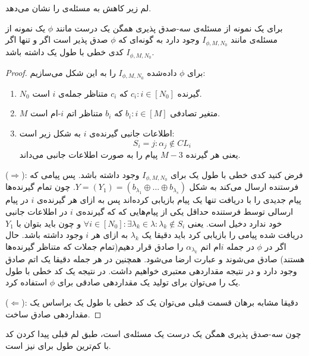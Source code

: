 لم زیر کاهش به مسئله‌ی
\picod
را نشان می‌دهد.
\begin{lemma}
    برای یک نمونه از مسئله‌ی سه-صدق پذیری همگن یک درست مانند
    $\phi$
    یک نمونه از مسئله‌ی
    \picod
    مانند
    $I_{\phi, M, N_0}$
    وجود دارد به گونه‌ای که
    $\phi$
    صدق پذیر است اگر و تنها اگر
    $I_{\phi, M, N_0}$
    کدی خطی با طول یک داشته باشد.
\end{lemma}
\begin{proof}
    برای
    $\phi$
    داده‌شده
    $I_{\phi, M, N_0}$
    را به این شکل می‌سازیم:
    \begin{enumerate}
        \item
        $N_0$
        گیرنده
        $c_i: i \in [N_0]$
        که
        $c_i$
        متناظر جمله‌ی
        $i$
        است.
        \item
        $M$
        متغیر تصادفی
        $b_i: i \in [M]$
        که
        $b_i$
        متناظر اتم‌
        $i$-ام است.
        \item
        اطلاعات جانبی گیرنده‌ی
        $i$
        به شکل زیر است:
        $$S_i = {j: \alpha_j \notin CL_i}$$
        یعنی هر گیرنده
        $M - 3$
        پیام را به صورت اطلاعات جانبی می‌داند.
    \end{enumerate}
    ($\Rightarrow$): فرض کنید کدی خطی با طول یک برای
    $I_{\phi, M, N_0}$
    وجود داشته باشد. پس پیامی که فرستنده ارسال می‌کند به شکل
    $Y = (Y_1) = (b_{\lambda_1} \oplus \ldots \oplus b_{\lambda_s})$. چون تمام گیرنده‌ها پیام جدیدی را با دریافت تنها یک پیام بازیابی کرده‌اند پس به ازای هر گیرنده‌ی $i$ در پیام ارسالی توسط فرستنده حداقل یکی از پیام‌هایی که که گیرنده‌ی $i$ در اطلاعات جانبی خود ندارد دخیل است. یعنی
    $\forall i \in [N_0]: \exists \lambda_k \in \lambda: \lambda_k \notin S_i$
    و چون باید بتوان با
    $Y_1$
    دریافت شده پیامی را بازیابی کرد باید دقیقا یک
    $\lambda_k$
    به ازای هر
    $i$
    وجود داشته باشد. حال اگر در
    $\phi$
    در جمله
    $i$ام اتم
    $\alpha_{\lambda_k}$
    را صادق قرار دهیم(تمام جملات که متناظر گیرنده‌ها هستند) صادق می‌شوند و عبارت ارضا می‌شود. همچنین در هر جمله دقیقا یک اتم صادق وجود دارد و در نتیجه مقداردهی معتبری خواهیم داشت. در نتیجه یک کد خطی با طول یک را می‌توان برای تولید یک مقداردهی صادقی برای
    $\phi$
    استفاده کرد.

    ($\Leftarrow$): دقیقا مشابه برهان قسمت قبلی می‌توان یک کد خطی با طول یک براساس یک مقداردهی صادق ساخت.
\end{proof}
چون سه-صدق پذیری همگن یک درست یک مسئله‌ی
\nphard
است، طبق لم قبلی پیدا کردن کد با کم‌ترین طول برای
\lpicod
نیز
\nphard
است.
